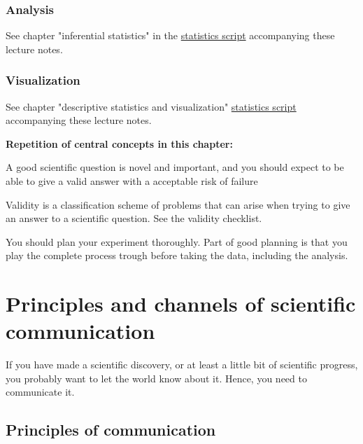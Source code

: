 \documentclass{tufte-book}
\begin{document}
\subsection{Analysis}

See chapter "inferential statistics" in the \href{https://github.com/florianhartig/ResearchSkills/raw/master/Labs/Statistics/Script/EssentialStatistics.pdf}{statistics script} accompanying these lecture notes.


\subsection{Visualization}

See chapter "descriptive statistics and visualization" \href{https://github.com/florianhartig/ResearchSkills/raw/master/Labs/Statistics/Script/EssentialStatistics.pdf}{statistics script} accompanying these lecture notes.


\vspace{1cm}
\begin{mdframed}
    
\textbf{Repetition of central concepts in this chapter:} 

\begin{itemize*}
  \item A good scientific question is novel and important, and you should expect to be able to give a valid answer with a acceptable risk of failure
  \item Validity is a classification scheme of problems that can arise when trying to give an answer to a scientific question. See the validity checklist.
  \item You should plan your experiment thoroughly. Part of good planning is that you play the complete process trough before taking the data, including the analysis.
\end{itemize*}

\end{mdframed}


\chapter{Principles and channels of scientific communication}

If you have made a scientific discovery, or at least a little bit of scientific progress, you probably want to let the world know about it. Hence, you need to communicate it.

\section{Principles of communication}
\end{document}
